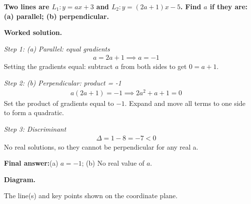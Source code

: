 \documentclass[11pt]{article}
\newcommand{\question}[1]{\par\medskip\noindent\textbf{#1}\par}
\begin{document}
\question{Two lines are \( L_1: y = ax + 3 \) and \( L_2: y = (2a+1)x - 5 \). Find \( a \) if they are: (a) parallel; (b) perpendicular.}

\textbf{Worked solution.}

\textit{Step 1: (a) Parallel: equal gradients}
\[\begin{gathered}
a = 2a + 1 \implies a = -1
\end{gathered}\]
Setting the gradients equal: subtract \( a \) from both sides to get \( 0 = a + 1 \).

\textit{Step 2: (b) Perpendicular: product = -1}
\[\begin{gathered}
a(2a+1) = -1 \implies 2a^2 + a + 1 = 0
\end{gathered}\]
Set the product of gradients equal to \( -1 \). Expand and move all terms to one side to form a quadratic.

\textit{Step 3: Discriminant}
\[\begin{gathered}
\Delta = 1 - 8 = -7 < 0
\end{gathered}\]
No real solutions, so they cannot be perpendicular for any real a.

\begin{answerbox}
\textbf{Final answer:}\quad (a) \(\displaystyle a = -1\); (b) No real value of \(\displaystyle a\).
\end{answerbox}
\textbf{Diagram.}

\begin{center}
\end{center}
\small The line(s) and key points shown on the coordinate plane.\normalsize
\end{document}
